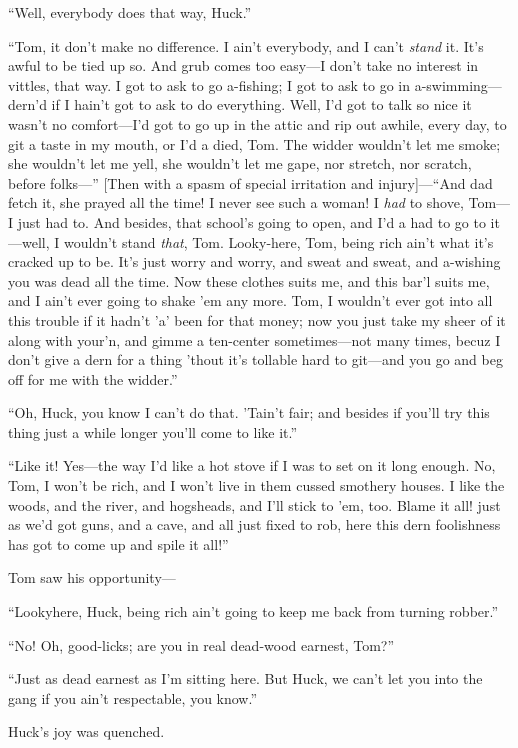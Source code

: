 \documentclass{book}
\begin{document}
“Well, everybody does that way, Huck.”

“Tom, it don’t make no difference. I ain’t everybody, and I can’t \emph{stand} it. It’s awful to be tied up so. And grub comes too easy—I don’t take no interest in vittles, that way. I got to ask to go a-fishing; I got to ask to go in a-swimming—dern’d if I hain’t got to ask to do everything. Well, I’d got to talk so nice it wasn’t no comfort—I’d got to go up in the attic and rip out awhile, every day, to git a taste in my mouth, or I’d a died, Tom. The widder wouldn’t let me smoke; she wouldn’t let me yell, she wouldn’t let me gape, nor stretch, nor scratch, before folks—” [Then with a spasm of special irritation and injury]—“And dad fetch it, she prayed all the time! I never see such a woman! I \emph{had} to shove, Tom—I just had to. And besides, that school’s going to open, and I’d a had to go to it—well, I wouldn’t stand \emph{that}, Tom. Looky-here, Tom, being rich ain’t what it’s cracked up to be. It’s just worry and worry, and sweat and sweat, and a-wishing you was dead all the time. Now these clothes suits me, and this bar’l suits me, and I ain’t ever going to shake ’em any more. Tom, I wouldn’t ever got into all this trouble if it hadn’t ’a’ been for that money; now you just take my sheer of it along with your’n, and gimme a ten-center sometimes—not many times, becuz I don’t give a dern for a thing ’thout it’s tollable hard to git—and you go and beg off for me with the widder.”

“Oh, Huck, you know I can’t do that. ’Tain’t fair; and besides if you’ll try this thing just a while longer you’ll come to like it.”

“Like it! Yes—the way I’d like a hot stove if I was to set on it long enough. No, Tom, I won’t be rich, and I won’t live in them cussed smothery houses. I like the woods, and the river, and hogsheads, and I’ll stick to ’em, too. Blame it all! just as we’d got guns, and a cave, and all just fixed to rob, here this dern foolishness has got to come up and spile it all!”

Tom saw his opportunity—

“Lookyhere, Huck, being rich ain’t going to keep me back from turning robber.”

“No! Oh, good-licks; are you in real dead-wood earnest, Tom?”

“Just as dead earnest as I’m sitting here. But Huck, we can’t let you into the gang if you ain’t respectable, you know.”

Huck’s joy was quenched.
\end{document}
